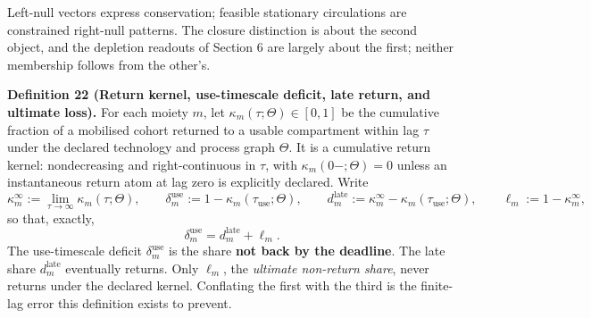 \documentclass[11pt]{article}
\begin{document}
Left-null vectors express conservation; feasible stationary circulations are constrained right-null patterns. The closure distinction is about the second object, and the depletion readouts of Section 6 are largely about the first; neither membership follows from the other's.

\textbf{Definition 22 (Return kernel, use-timescale deficit, late return, and ultimate loss).} For each moiety \(m\), let \(\kappa_m(\tau;\Theta)\in[0,1]\) be the cumulative fraction of a mobilised cohort returned to a usable compartment within lag \(\tau\) under the declared technology and process graph \(\Theta\). It is a cumulative return kernel: nondecreasing and right-continuous in \(\tau\), with \(\kappa_m(0-;\Theta)=0\) unless an instantaneous return atom at lag zero is explicitly declared. Write
$$\kappa_m^\infty:=\lim_{\tau\to\infty}\kappa_m(\tau;\Theta),\qquad
\delta_m^{\mathrm{use}}:=1-\kappa_m(\tau_{\mathrm{use}};\Theta),\qquad
d_m^{\mathrm{late}}:=\kappa_m^\infty-\kappa_m(\tau_{\mathrm{use}};\Theta),\qquad
\ell_m:=1-\kappa_m^\infty,$$
so that, exactly,
$$\delta_m^{\mathrm{use}}=d_m^{\mathrm{late}}+\ell_m.$$
The use-timescale deficit \(\delta_m^{\mathrm{use}}\) is the share \textbf{not back by the deadline}. The late share \(d_m^{\mathrm{late}}\) eventually returns. Only \(\ell_m\), the \emph{ultimate non-return share}, never returns under the declared kernel. Conflating the first with the third is the finite-lag error this definition exists to prevent.
\end{document}
